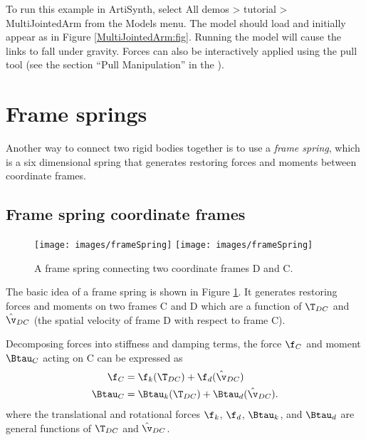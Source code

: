 To run this example in ArtiSynth, select {\sf All demos > tutorial >
MultiJointedArm} from the {\sf Models} menu. The model should load and
initially appear as in Figure \ref{MultiJointedArm:fig}.  Running the model
will cause the links to fall under gravity.  Forces can also be interactively
applied using the pull tool (see the section ``Pull Manipulation'' in the
).

\section{Frame springs}
\label{FrameSprings:sec}

Another way to connect two rigid bodies together is to use a {\it
frame spring}, which is a six dimensional spring that generates
restoring forces and moments between coordinate frames.

\subsection{Frame spring coordinate frames}
\label{FrameSpringCoordinateFrames:sec}

\begin{figure}[ht]
\begin{center}
 \iflatexml
   \texttt{[image: images/frameSpring]}
 \else
   \texttt{[image: images/frameSpring]}
 \fi
\end{center}
\caption{A frame spring connecting two coordinate frames D and C.}
\label{frameSpring:fig}
\end{figure}

The basic idea of a frame spring is shown in Figure
\ref{frameSpring:fig}. It generates restoring forces and moments on
two frames C and D which are a function of $\T_{DC}$ and $\hat\v_{DC}$
(the spatial velocity of frame D with respect to frame C).

Decomposing forces into stiffness and damping terms, the force
$\f_C$ and moment $\Btau_C$ acting on C can be expressed as 
%
\begin{align}
\f_C & = \f_{k} (\T_{DC}) + \f_{d} (\hat\v_{DC}) \notag \\
\Btau_C & = \Btau_{k} (\T_{DC}) + \Btau_{d} (\hat\v_{DC}).
\label{ftauC:eqn}
\end{align}
%
where the translational and rotational forces $\f_{k}$, $\f_{d}$,
$\Btau_{k}$, and $\Btau_{d}$ are general functions of $\T_{DC}$ and
$\hat\v_{DC}$.


